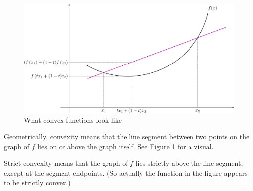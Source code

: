%

\begin{figure}
  \centering
  \includegraphics[width=\linewidth]{convex-function}
  \caption{What convex functions look like}
  \label{fig:convexfunction}
\end{figure}

Geometrically, convexity means that the line segment between two points on the graph of $f$ lies on or above the graph itself.
See Figure \ref{fig:convexfunction} for a visual.

Strict convexity means that the graph of $f$ lies strictly above the line segment, except at the segment endpoints.
(So actually the function in the figure appears to be strictly convex.)

